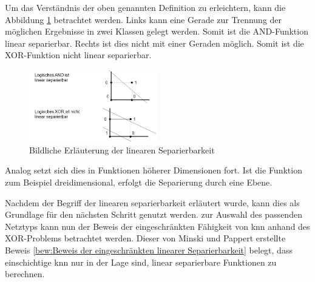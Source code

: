 Um das Verständnis der oben genannten Definition zu erleichtern, kann die Abbildung \ref{fig:Bildliche Erläuterung der linearen Separierbarkeit} betrachtet werden. Links kann eine Gerade zur Trennung der möglichen Ergebnisse in zwei Klassen gelegt werden. Somit ist die AND-Funktion linear separierbar. Rechts ist dies nicht mit einer Geraden möglich. Somit ist die XOR-Funktion nicht linear separierbar.  

\begin{figure}[H]
\centering
		\includegraphics[width=0.5\textwidth]{Linear_Sep.PNG}
	\caption{Bildliche Erläuterung der linearen Separierbarkeit}
	\label{fig:Bildliche Erläuterung der linearen Separierbarkeit}
\end{figure}

Analog setzt sich dies in Funktionen höherer Dimensionen fort. Ist die Funktion zum Beispiel dreidimensional, erfolgt die Separierung durch eine Ebene.


Nachdem der Begriff der linearen separierbarkeit erläutert wurde, kann dies als Grundlage für den nächsten Schritt genutzt werden. zur Auswahl des passenden Netztyps kann nun der Beweis der eingeschränkten Fähigkeit von \acs{knn} anhand des XOR-Problems betrachtet werden. Dieser von Minski und Pappert erstellte Beweis \ref{bew:Beweis der eingeschränkten linearer Separierbarkeit} belegt, dass einschichtige \acs{knn} nur in der Lage sind, linear separierbare Funktionen zu berechnen.

